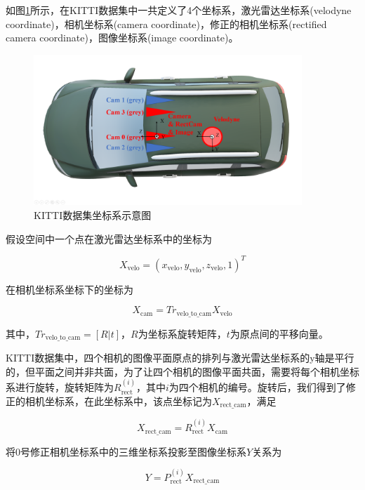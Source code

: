 如图\ref{fig5}所示，在KITTI数据集中一共定义了4个坐标系，激光雷达坐标系(velodyne coordinate)，相机坐标系(camera coordinate)，修正的相机坐标系(rectified camera coordinate)，图像坐标系(image coordinate)。

\begin{figure}[htb] 
    \center
    \includegraphics[width=0.9\textwidth]{figure/fig5.png}
    \caption{KITTI数据集坐标系示意图}
    \label{fig5}
\end{figure}

假设空间中一个点在激光雷达坐标系中的坐标为

\begin{equation}
    X_{\text{velo}}=(x_{\text{velo}},y_{\text{velo}},z_{\text{velo}},1)^T
\end{equation}

在相机坐标系坐标下的坐标为

\begin{equation}
    X_{\text{cam}} = Tr_{\text{velo\_to\_cam}} X_{\text{velo}}
  \end{equation}
  
其中，$Tr_{\text{velo\_to\_cam}} = [R|t]$，$R$为坐标系旋转矩阵，$t$为原点间的平移向量。

KITTI数据集中，四个相机的图像平面原点的排列与激光雷达坐标系的y轴是平行的，但平面之间并非共面，为了让四个相机的图像平面共面，需要将每个相机坐标系进行旋转，旋转矩阵为$R_{\text{rect}}^{(i)}$，其中$i$为四个相机的编号。旋转后，我们得到了修正的相机坐标系，在此坐标系中，该点坐标记为$X_{\text{rect\_cam}}$，满足

\begin{equation}
    X_{\text{rect\_cam}} = R_{\text{rect}}^{(i)} X_{\text{cam}}
\end{equation}

将0号修正相机坐标系中的三维坐标系投影至图像坐标系$Y$关系为

\begin{equation}
    Y = P_{\text{rect}}^{(i)}X_{\text{rect\_cam}}
\end{equation}

